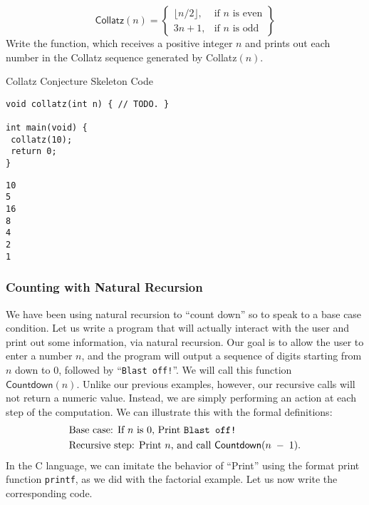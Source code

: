 \begin{equation*}
\textsf{Collatz}(n) = 
\left\{
    \begin{array}{lr}
        \lfloor{n / 2}\rfloor, & \text{if } n \text{ is even} \\
        3n + 1, & \text{if } n \text{ is odd}
    \end{array}
\right\}
\end{equation*}
Write the  function, which receives a positive integer $n$ and prints out each number in the Collatz sequence generated by \textsf{Collatz}$(n)$.
\begin{cloast}[main.c]{Collatz Conjecture Skeleton Code}
\begin{lstlisting}[language=MyC]
void collatz(int n) { // TODO. }

int main(void) {
 collatz(10);
 return 0;
}
\end{lstlisting}
\tcblower
\begin{lstlisting}[language=MyOutput]
10
5
16
8
4
2
1
\end{lstlisting}
\end{cloast}

\subsubsection*{Counting with Natural Recursion}
We have been using natural recursion to ``count down'' so to speak to a base case condition. Let us write a program that will actually interact with the user and print out some information, via natural recursion. Our goal is to allow the user to enter a number $n$, and the program will output a sequence of digits starting from $n$ down to $0$, followed by ``\texttt{Blast off!}''. We will call this function $\textsf{Countdown}(n)$. Unlike our previous examples, however, our recursive calls will not return a numeric value. Instead, we are simply performing an action at each step of the computation. We can illustrate this with the formal definitions:
\begin{align*}
    &\text{Base case: If }n\text{ is }0\text{, Print \texttt{Blast off!}}\\
    &\text{Recursive step: Print }n\text{, and call } \textsf{Countdown}(n\;-\;1).
\end{align*}
In the C language, we can imitate the behavior of ``Print'' using the format print function \texttt{printf}, as we did with the factorial example. Let us now write the corresponding code.

